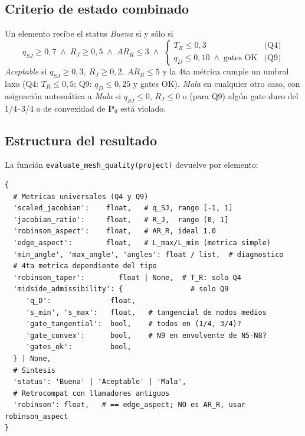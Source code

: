 \documentclass[11pt,a4paper]{article}
\begin{document}
\subsection{Criterio de estado combinado}
Un elemento recibe el status \emph{Buena} si y s\'olo si
\begin{equation}
q_{SJ} \ge 0{,}7 \;\wedge\; R_J \ge 0{,}5 \;\wedge\; AR_R \le 3 \;\wedge\;
\begin{cases}
T_R \le 0{,}3 & \text{(Q4)}\\
q_D \le 0{,}10 \;\wedge\; \text{gates OK} & \text{(Q9)}
\end{cases}
\label{eq:status_buena}
\end{equation}
\emph{Aceptable} si $q_{SJ} \ge 0{,}3,\ R_J \ge 0{,}2,\ AR_R \le 5$ y la 4ta m\'etrica cumple un umbral laxo (Q4: $T_R \le 0{,}5$; Q9: $q_D \le 0{,}25$ y gates OK). \emph{Mala} en cualquier otro caso, con asignaci\'on autom\'atica a \emph{Mala} si $q_{SJ} \le 0$, $R_J \le 0$ o (para Q9) alg\'un gate duro del 1/4--3/4 o de convexidad de $\mathbf{P}_9$ est\'a violado.

\subsection{Estructura del resultado}
La funci\'on \texttt{evaluate\_mesh\_quality(project)} devuelve por elemento:

\begin{lstlisting}[caption={Campos del diccionario devuelto por \texttt{evaluate\_mesh\_quality}}]
{
  # Metricas universales (Q4 y Q9)
  'scaled_jacobian':    float,   # q_SJ, rango [-1, 1]
  'jacobian_ratio':     float,   # R_J,  rango (0, 1]
  'robinson_aspect':    float,   # AR_R, ideal 1.0
  'edge_aspect':        float,   # L_max/L_min (metrica simple)
  'min_angle', 'max_angle', 'angles': float / list,  # diagnostico
  # 4ta metrica dependiente del tipo
  'robinson_taper':        float | None,  # T_R: solo Q4
  'midside_admissibility': {                # solo Q9
     'q_D':              float,
     's_min', 's_max':   float,   # tangencial de nodos medios
     'gate_tangential':  bool,    # todos en (1/4, 3/4)?
     'gate_convex':      bool,    # N9 en envolvente de N5-N8?
     'gates_ok':         bool,
  } | None,
  # Sintesis
  'status': 'Buena' | 'Aceptable' | 'Mala',
  # Retrocompat con llamadores antiguos
  'robinson': float,   # == edge_aspect; NO es AR_R, usar robinson_aspect
}
\end{lstlisting}
\end{document}
